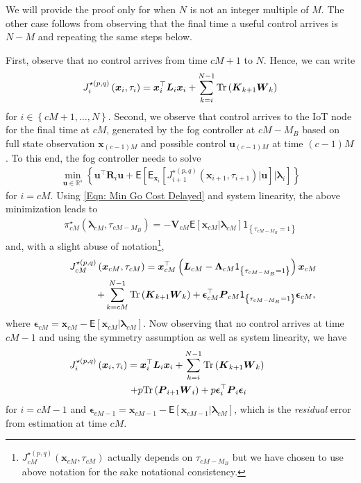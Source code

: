 \documentclass[10pt, journal, letterpaper]{IEEEtran}
\newcommand{\paren}[1]{\left(#1\right)}
\newcommand{\brparen}[1]{\left\{#1\right\}}
\newcommand{\field}[1]{\ensuremath{\mathbb{#1}}}
\newcommand{\R}{\ensuremath{\field{R}}} %
\newcommand{\1}{\ensuremath{\mathbf{1}}} %
\newcommand{\I}[1]{\ensuremath{\mathsf{1}_{\left\{#1\right\}}}} %
\newcommand{\ES}[1]{\ensuremath{\mathsf{E}\left[#1 \right]}} %
\newcommand{\ESI}[2]{\ensuremath{\mathsf{E}_{#2}\left[#1 \right]}}
\newcommand{\mingocost}[3]{\ensuremath{J_{#3}^{\star \paren{#1, #2}}\paren{\vec{x}_{#3}, \tau_{#3}}}}
\renewcommand{\vec}[1]{\ensuremath{\boldsymbol{#1}}} %
\newcommand{\tr}[1]{\ensuremath{{\rm Tr}\left(#1\right)}}
\begin{document}
\begin{IEEEproof}
We will provide the proof only for when $N$ is not an integer multiple of $M$.  The other case follows from observing that the final time a useful control arrives is $N-M$ and repeating the same steps below.

First, observe that no control arrives from time $cM + 1$ to $N$. Hence, we can write
\begin{eqnarray}
\mingocost{p}{q}{i} = \vec{x}_i^\top \vec{L}_i \vec{x}_i + \sum_{k=i}^{N-1} \tr{\vec{K}_{k+1}\vec{W}_k} \label{Eqn: Min Go Cost Delayed}
\end{eqnarray}
for $i \in \brparen{cM+1, \ldots, N}$. Second, we observe that control arrives to the IoT node for the final time at $cM$, generated by the fog controller at $cM - M_B$ based on full state observation $\vec{x}_{(c-1)M}$ and possible control $\vec{u}_{(c-1)M}$ at time $(c-1)M$. To this end,
the fog controller needs to solve
\begin{eqnarray*}
\min_{\vec{u} \in \R^s}\brparen{\vec{u}^\top \vec{R}_{i} \vec{u} + \ES{\ESI{\mingocost{p}{q}{i+1}\Big|\vec{u}}{\vec{x}_i} \Big| \vec{\lambda}_i}}
\end{eqnarray*}
for $i = cM$. Using \eqref{Eqn: Min Go Cost Delayed} and system linearity, the above minimization leads to
\begin{eqnarray*}
\pi_{cM}^\star\paren{\vec{\lambda}_{cM}, \tau_{cM-M_B}} = -\vec{V}_{cM} \ES{\vec{x}_{cM} \big|\vec{\lambda}_{cM}} \I{\tau_{cM-M_B} = 1}
\end{eqnarray*}
and, with a slight abuse of notation\footnote{$\mingocost{p}{q}{cM}$ actually depends on $\tau_{cM-M_B}$ but we have chosen to use above notation for the sake notational consistency.},
\begin{eqnarray*}
\lefteqn{\mingocost{p}{q}{cM} = \vec{x}_{cM}^\top \paren{\vec{L}_{cM} - \vec{\Lambda}_{cM} \I{\tau_{cM-M_B}=1}} \vec{x}_{cM}} \hspace{8cm} \\
\lefteqn{+\sum_{k=cM}^{N-1} \tr{\vec{K}_{k+1} \vec{W}_k} + \vec{\epsilon}_{cM}^\top \vec{P}_{cM} \I{\tau_{cM-M_B}=1} \vec{\epsilon}_{cM},} \hspace{7.0cm}
\end{eqnarray*}
where $\vec{\epsilon}_{cM} = \vec{x}_{cM} - \ES{\vec{x}_{cM} \big| \vec{\lambda}_{cM}}$. Now observing that no control arrives at time $cM-1$ and using the symmetry assumption as well as system linearity, we have
\begin{eqnarray}
\lefteqn{\mingocost{p}{q}{i} = \vec{x}_i^\top \vec{L}_i \vec{x}_i + \sum_{k=i}^{N-1} \tr{\vec{K}_{k+1}\vec{W}_k}} \hspace{8cm} \nonumber \\
\lefteqn{+p\tr{\vec{P}_{i+1} \vec{W}_i} + p \vec{\epsilon}_i^\top \vec{P}_i \vec{\epsilon}_i} \hspace{5.8cm} \nonumber
\end{eqnarray}
for $i = cM - 1$ and $\vec{\epsilon}_{cM-1} = \vec{x}_{cM-1} - \ES{\vec{x}_{cM-1} \big| \vec{\lambda}_{cM}}$, which is the {\em residual} error from estimation at time $cM$.


\end{IEEEproof}
\end{document}
